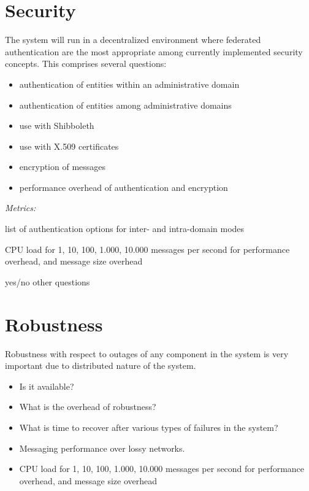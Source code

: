 \documentclass[a4paper]{report}
\newenvironment{metrics}{\par\emph{Metrics:}\begin{compactitem}}{\end{compactitem}}
\begin{document}
\section{Security}

The system will run in a decentralized environment where federated
authentication are the most appropriate among currently implemented security
concepts. This comprises several questions:

\begin{itemize}

\item authentication of entities within an administrative domain

\item authentication of entities among administrative domains

\item use with Shibboleth

\item use with X.509 certificates

\item encryption of messages

\item performance overhead of authentication and encryption

\end{itemize}

\begin{metrics}

\item list of authentication options for inter- and intra-domain modes

\item CPU load for 1, 10, 100, 1.000, 10.000 messages per second for
performance overhead, and message size overhead

\item yes/no other questions

\end{metrics}



\section{Robustness}

Robustness with respect to outages of any component in the system is very
important due to distributed nature of the system.

\begin{itemize}

\item Is it available?

\item What is the overhead of robustness?

\item What is time to recover after various types of failures in the system?

\item Messaging performance over lossy networks.

\item CPU load for 1, 10, 100, 1.000, 10.000 messages per second for
performance overhead, and message size overhead

\end{itemize}
\end{document}
